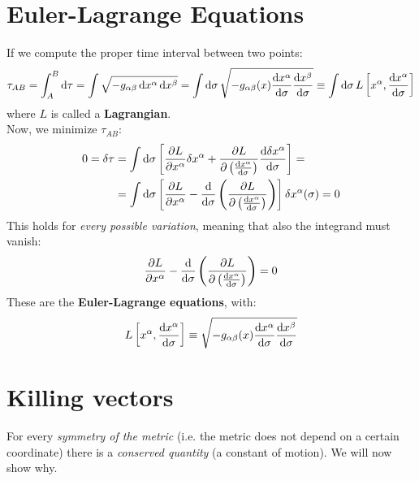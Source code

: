 \documentclass[../template.tex]{subfiles}
\begin{document}
\section{Euler-Lagrange Equations}
If we compute the proper time interval between two points:
\begin{align*}
    \tau_{AB} = \int_A^B \dd{\tau} = \int \sqrt{-g_{\alpha \beta} \dd{x^\alpha}\dd{x^\beta}} = \int \dd{\sigma} \sqrt{-g_{\alpha \beta}(x) \dv{x^\alpha}{\sigma} \dv{x^\beta}{\sigma}} \equiv \int \dd{\sigma} L\left[x^\alpha, \dv{x^\alpha}{\sigma} \right]
\end{align*}
where $L$ is called a \textbf{Lagrangian}.\\

Now, we minimize $\tau_{AB}$:
\begin{align*}
    0 = \delta \tau &= \int \dd{\sigma} \left[\pdv{L}{x^\alpha} \delta x^\alpha + \pdv{L}{\left(\dv{x^\alpha}{\sigma}\right)} \dv{\delta x^\alpha}{\sigma}\right] =\\
    &= \int \dd{\sigma} \left[\pdv{L}{x^\alpha} - \dv{\sigma}\left(\pdv{L}{\left(\dv{x^\alpha}{\sigma}\right)}\right)\right] \delta x^\alpha (\sigma) = 0
\end{align*} 
This holds for \textit{every possible variation}, meaning that also the integrand must vanish:
\begin{align*}
    \pdv{L}{x^\alpha} - \dv{\sigma}\left(\pdv{L}{\left(\dv{x^\alpha}{\sigma}\right)}\right) = 0
\end{align*} 
These are the \textbf{Euler-Lagrange equations}, with:
\begin{align*}
    L\left[x^\alpha, \dv{x^\alpha}{\sigma}\right] \equiv \sqrt{-g_{\alpha \beta}(x) \dv{x^\alpha}{\sigma} \dv{x^\beta}{\sigma}}
\end{align*} 

\section{Killing vectors}
For every \textit{symmetry of the metric} (i.e. the metric does not depend on a certain coordinate) there is a \textit{conserved quantity} (a constant of motion). We will now show why.\\
\end{document}
